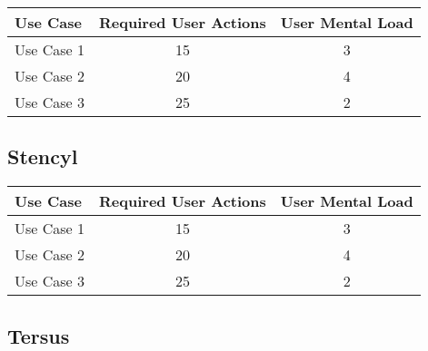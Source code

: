 \begin{tabularx}{\textwidth}{Xcc}
\textbf{Use Case} & \textbf{Required User Actions} & \textbf{User Mental Load}\\
\hline
Use Case 1                          & 15 & 3 \\
Use Case 2                          & 20 & 4 \\
Use Case 3                          & 25 & 2
\end{tabularx}

\subsection{Stencyl}




\begin{tabularx}{\textwidth}{Xcc}
\textbf{Use Case} & \textbf{Required User Actions} & \textbf{User Mental Load}\\
\hline
Use Case 1                          & 15 & 3 \\
Use Case 2                          & 20 & 4 \\
Use Case 3                          & 25 & 2
\end{tabularx}

\subsection{Tersus}

